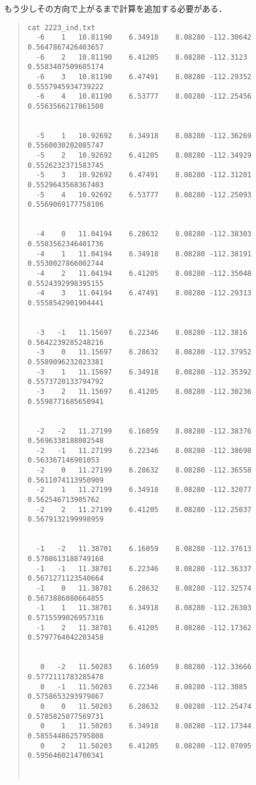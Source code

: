 もう少しその方向で上がるまで計算を追加する必要がある．
\begin{quote}\begin{verbatim}
cat 2223_ind.txt 
  -6    1   10.81190    6.34918    8.08280 -112.30642 0.5647867426403657
  -6    2   10.81190    6.41205    8.08280 -112.3123 0.5583407509605174
  -6    3   10.81190    6.47491    8.08280 -112.29352 0.5557945934739222
  -6    4   10.81190    6.53777    8.08280 -112.25456 0.5563566217861508


  -5    1   10.92692    6.34918    8.08280 -112.36269 0.5560030202085747
  -5    2   10.92692    6.41205    8.08280 -112.34929 0.5526232371583745
  -5    3   10.92692    6.47491    8.08280 -112.31201 0.5529643568367403
  -5    4   10.92692    6.53777    8.08280 -112.25093 0.5569069177758106


  -4    0   11.04194    6.28632    8.08280 -112.38303 0.5583562346401736
  -4    1   11.04194    6.34918    8.08280 -112.38191 0.5530027866002744
  -4    2   11.04194    6.41205    8.08280 -112.35048 0.5524392998395155
  -4    3   11.04194    6.47491    8.08280 -112.29313 0.5558542901904441


  -3   -1   11.15697    6.22346    8.08280 -112.3816 0.5642239285248216
  -3    0   11.15697    6.28632    8.08280 -112.37952 0.5589096232023381
  -3    1   11.15697    6.34918    8.08280 -112.35392 0.5573720133794792
  -3    2   11.15697    6.41205    8.08280 -112.30236 0.5598771685650941


  -2   -2   11.27199    6.16059    8.08280 -112.38376 0.5696338188082548
  -2   -1   11.27199    6.22346    8.08280 -112.38698 0.563367146901053
  -2    0   11.27199    6.28632    8.08280 -112.36558 0.5611074113950909
  -2    1   11.27199    6.34918    8.08280 -112.32077 0.562546713905762
  -2    2   11.27199    6.41205    8.08280 -112.25037 0.5679132199998959


  -1   -2   11.38701    6.16059    8.08280 -112.37613 0.5708613188749168
  -1   -1   11.38701    6.22346    8.08280 -112.36337 0.5671271123540664
  -1    0   11.38701    6.28632    8.08280 -112.32574 0.5673886080664855
  -1    1   11.38701    6.34918    8.08280 -112.26303 0.5715599026957316
  -1    2   11.38701    6.41205    8.08280 -112.17362 0.5797764042203458


   0   -2   11.50203    6.16059    8.08280 -112.33666 0.5772111783285478
   0   -1   11.50203    6.22346    8.08280 -112.3085 0.5758653293979867
   0    0   11.50203    6.28632    8.08280 -112.25474 0.5785825077569731
   0    1   11.50203    6.34918    8.08280 -112.17344 0.5855448625795808
   0    2   11.50203    6.41205    8.08280 -112.07095 0.5956460214700341



\end{verbatim}
\end{quote}
